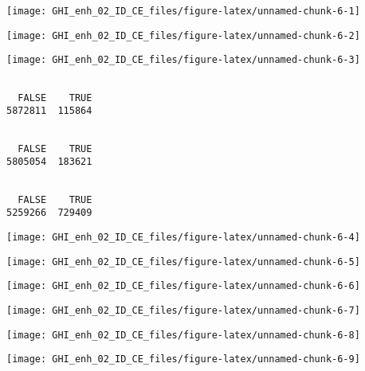 \documentclass[
  10pt,
  a4paper,oneside]{article}
\begin{document}
\begin{center}\texttt{[image: GHI\_enh\_02\_ID\_CE\_files/figure-latex/unnamed-chunk-6-1]} \end{center}

\begin{center}\texttt{[image: GHI\_enh\_02\_ID\_CE\_files/figure-latex/unnamed-chunk-6-2]} \end{center}

\begin{center}\texttt{[image: GHI\_enh\_02\_ID\_CE\_files/figure-latex/unnamed-chunk-6-3]} \end{center}

\begin{verbatim}

  FALSE    TRUE 
5872811  115864 
\end{verbatim}

\begin{verbatim}

  FALSE    TRUE 
5805054  183621 
\end{verbatim}

\begin{verbatim}

  FALSE    TRUE 
5259266  729409 
\end{verbatim}

\begin{center}\texttt{[image: GHI\_enh\_02\_ID\_CE\_files/figure-latex/unnamed-chunk-6-4]} \end{center}

\begin{center}\texttt{[image: GHI\_enh\_02\_ID\_CE\_files/figure-latex/unnamed-chunk-6-5]} \end{center}

\begin{center}\texttt{[image: GHI\_enh\_02\_ID\_CE\_files/figure-latex/unnamed-chunk-6-6]} \end{center}

\begin{center}\texttt{[image: GHI\_enh\_02\_ID\_CE\_files/figure-latex/unnamed-chunk-6-7]} \end{center}

\begin{center}\texttt{[image: GHI\_enh\_02\_ID\_CE\_files/figure-latex/unnamed-chunk-6-8]} \end{center}

\begin{center}\texttt{[image: GHI\_enh\_02\_ID\_CE\_files/figure-latex/unnamed-chunk-6-9]} \end{center}
\end{document}
